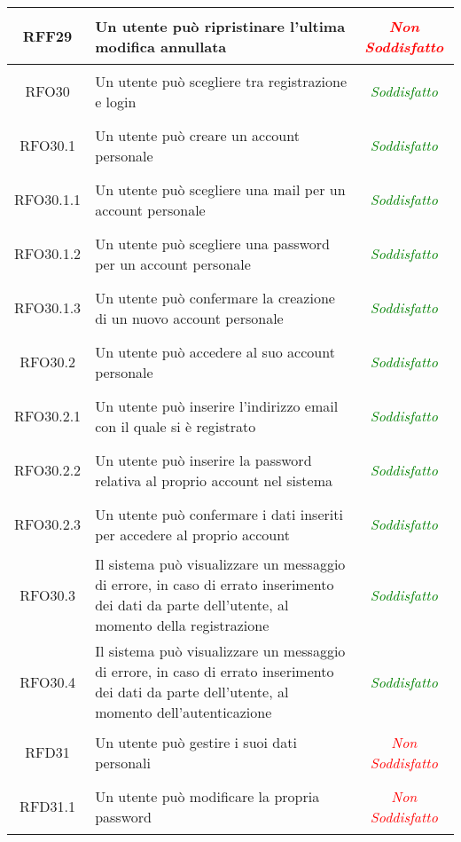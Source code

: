 \begin{longtable}{|c|>{\centering}m{7cm}|c|}
\hypertarget{RFF29}{RFF29} & Un utente può ripristinare l'ultima modifica annullata & \textcolor{Red}{\textit{Non Soddisfatto}}\\ \hline
\hypertarget{RFO30}{RFO30} & Un utente può scegliere tra registrazione e login & \textcolor{Green}{\textit{Soddisfatto}}\\ \hline
\hypertarget{RFO30.1}{RFO30.1} & Un utente può creare un account personale & \textcolor{Green}{\textit{Soddisfatto}}\\ \hline
\hypertarget{RFO30.1.1}{RFO30.1.1} & Un utente può scegliere una mail per un account personale & \textcolor{Green}{\textit{Soddisfatto}}\\ \hline
\hypertarget{RFO30.1.2}{RFO30.1.2} & Un utente può scegliere una password per un account personale & \textcolor{Green}{\textit{Soddisfatto}}\\ \hline
\hypertarget{RFO30.1.3}{RFO30.1.3} & Un utente può confermare la creazione di un nuovo account personale & \textcolor{Green}{\textit{Soddisfatto}}\\ \hline
\hypertarget{RFO30.2}{RFO30.2} & Un utente può accedere al suo account personale & \textcolor{Green}{\textit{Soddisfatto}}\\ \hline
\hypertarget{RFO30.2.1}{RFO30.2.1} & Un utente può inserire l’indirizzo email con il quale si è registrato & \textcolor{Green}{\textit{Soddisfatto}}\\ \hline
\hypertarget{RFO30.2.2}{RFO30.2.2} & Un utente può inserire la password relativa al proprio account nel sistema & \textcolor{Green}{\textit{Soddisfatto}}\\ \hline
\hypertarget{RFO30.2.3}{RFO30.2.3} & Un utente può confermare i dati inseriti per accedere al proprio account & \textcolor{Green}{\textit{Soddisfatto}}\\ \hline
\hypertarget{RFO30.3}{RFO30.3} & Il sistema può visualizzare un messaggio di errore, in caso di errato inserimento dei dati da parte dell’utente, al momento della registrazione & \textcolor{Green}{\textit{Soddisfatto}}\\ \hline
\hypertarget{RFO30.4}{RFO30.4} & Il sistema può visualizzare un messaggio di errore, in caso di errato inserimento dei dati da parte dell’utente, al momento dell’autenticazione & \textcolor{Green}{\textit{Soddisfatto}}\\ \hline
\hypertarget{RFD31}{RFD31} & Un utente può gestire i suoi dati personali & \textcolor{Red}{\textit{Non Soddisfatto}}\\ \hline
\hypertarget{RFD31.1}{RFD31.1} & Un utente può modificare la propria password & \textcolor{Red}{\textit{Non Soddisfatto}}\\ \hline

\end{longtable}
